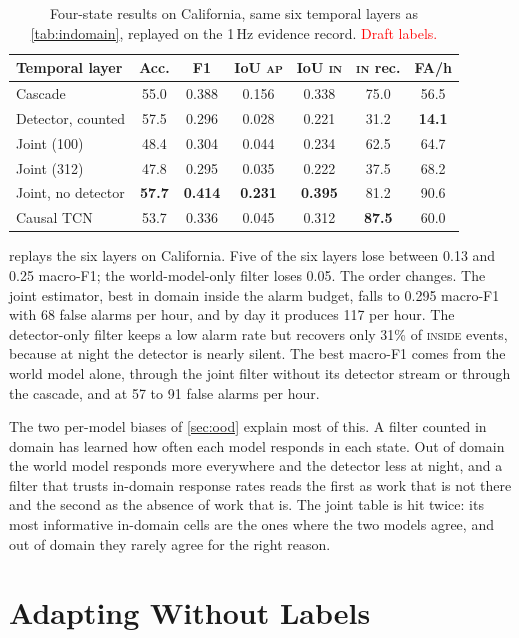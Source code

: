 \documentclass[conference]{IEEEtran}
\newcommand{\st}[1]{\textsc{#1}}
\newcommand{\draftnote}[1]{\textcolor{red}{#1}}
\begin{document}
\begin{table}[t]
\centering
\caption{Four-state results on California, same six temporal layers as \cref{tab:indomain}, replayed on the 1\,Hz evidence record. \draftnote{Draft labels.}}
\label{tab:ood}
\footnotesize
\setlength{\tabcolsep}{3.2pt}
\begin{tabular}{@{}lcccccc@{}}
\toprule
Temporal layer & Acc. & F1 & IoU \st{ap} & IoU \st{in} & \st{in} rec. & FA/h \\
\midrule
Cascade & 55.0 & 0.388 & 0.156 & 0.338 & 75.0 & 56.5 \\
Detector, counted & 57.5 & 0.296 & 0.028 & 0.221 & 31.2 & \textbf{14.1} \\
Joint (100) & 48.4 & 0.304 & 0.044 & 0.234 & 62.5 & 64.7 \\
Joint (312) & 47.8 & 0.295 & 0.035 & 0.222 & 37.5 & 68.2 \\
Joint, no detector & \textbf{57.7} & \textbf{0.414} & \textbf{0.231} & \textbf{0.395} & 81.2 & 90.6 \\
Causal TCN & 53.7 & 0.336 & 0.045 & 0.312 & \textbf{87.5} & 60.0 \\
\bottomrule
\end{tabular}
\end{table}

 replays the six layers on California. Five of the six layers lose between 0.13 and 0.25 macro-F1; the world-model-only filter loses 0.05. The order changes. The joint estimator, best in domain inside the alarm budget, falls to 0.295 macro-F1 with 68 false alarms per hour, and by day it produces 117 per hour. The detector-only filter keeps a low alarm rate but recovers only 31\% of \st{inside} events, because at night the detector is nearly silent. The best macro-F1 comes from the world model alone, through the joint filter without its detector stream or through the cascade, and at 57 to 91 false alarms per hour.

The two per-model biases of \cref{sec:ood} explain most of this. A filter counted in domain has learned how often each model responds in each state. Out of domain the world model responds more everywhere and the detector less at night, and a filter that trusts in-domain response rates reads the first as work that is not there and the second as the absence of work that is. The joint table is hit twice: its most informative in-domain cells are the ones where the two models agree, and out of domain they rarely agree for the right reason.

\section{Adapting Without Labels}
\label{sec:adapt}
\end{document}
